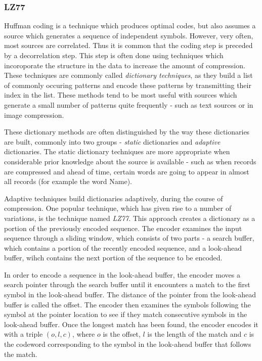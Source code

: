 \documentclass[thesis=M,english]{FITthesis}[2012/10/20]
\begin{document}
\subsubsection{LZ77}
Huffman coding is a technique which produces optimal codes, but also assumes a
source which generates a sequence of independent symbols. However, very often,
most sources are correlated. Thus it is common that the coding step is preceded by
a decorrelation step. This step is often done using techniques which incoroporate
the structure in the data to increase the amount of compression. These techniques
are commonly called \emph{dictionary techniques}, as they build a list of
commonly occuring patterns and encode these patterns by transmitting their index in
the list. These methods tend to be most useful with sources which generate a small
number of patterns quite frequently - such as text sources or in image compression.\cite{datacompression}

These dictionary methods are often distinguished by the way these dictionaries are
built, commonly into two groups - \emph{static} dictionaries and \emph{adaptive}
dictionaries. The static dictionary techniques are more appropriate when considerable
prior knowledge about the source is available - such as when records are compressed
and ahead of time, certain words are going to appear in almost all records (for example
the word Name).

Adaptive techniques build dictionaries adaptively, during the course of compression. One
popular technique, which has given rise to a number of variations, is the technique
named \emph{LZ77}. This approach creates a dictionary as a portion of the previously
encoded sequence. The encoder examines the input sequence through a sliding
window, which consists of two parts - a search buffer, which contains a portion
of the recently encoded sequence, and a look-ahead buffer, wihch contains the
next portion of the sequence to be encoded.

In order to encode a sequence in the look-ahead buffer, the encoder moves a search
pointer through the search buffer until it encounters a match to the first symbol in the
look-ahead buffer. The distance of the pointer from the look-ahead buffer is called the offset.
The encoder then examines the symbols following the symbol at the
pointer location to see if they match consecutive symbols in the look-ahead buffer.
Once the longest match has been found, the encoder encodes it with a triple
$(o, l, c)$, where $o$ is the offset, $l$ is the length of the match and $c$ is
the codeword corresponding to the symbol in the look-ahead buffer that follows the match.\cite{lz77}
\end{document}

